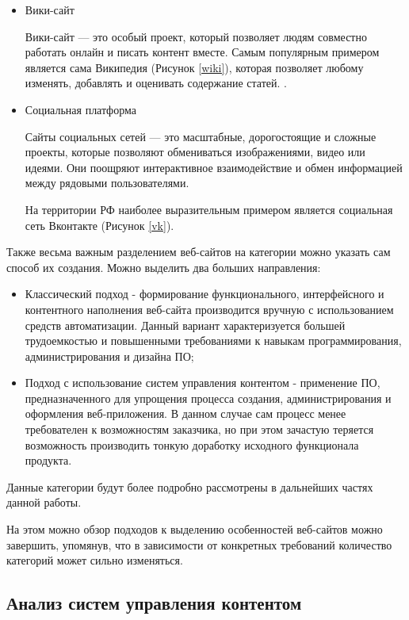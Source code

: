\begin{itemize}
    \item Вики-сайт
    
    Вики-сайт — это особый проект, который позволяет людям совместно работать онлайн и писать контент вместе. 
    Самым популярным примером является сама Википедия \cite{wiki} (Рисунок \ref{wiki}), которая позволяет любому изменять, добавлять и оценивать содержание статей.
    .
    
    \item Социальная платформа
    
    Сайты социальных сетей — это масштабные, дорогостоящие и сложные проекты, которые позволяют обмениваться изображениями, видео или идеями. 
    Они поощряют интерактивное взаимодействие и обмен информацией между рядовыми пользователями.
    
    На территории РФ наиболее выразительным примером является социальная сеть Вконтакте \cite{vk} (Рисунок \ref{vk}).
\end{itemize}

Также весьма важным разделением веб-сайтов на категории можно указать сам способ их создания.
Можно выделить два больших направления:
\begin{itemize}
    \item Классический подход - формирование функционального, интерфейсного и контентного наполнения веб-сайта производится вручную с использованием средств автоматизации.
    Данный вариант характеризуется большей трудоемкостью и повышенными требованиями к навыкам программирования, администрирования и дизайна ПО;
    \item Подход с использование систем управления контентом - применение ПО, предназначенного для упрощения процесса создания, администрирования и оформления веб-приложения.
    В данном случае сам процесс менее требователен к возможностям заказчика, но при этом зачастую теряется возможность производить тонкую доработку исходного функционала продукта.
\end{itemize}
Данные категории будут более подробно рассмотрены в дальнейших частях данной работы.

На этом можно обзор подходов к выделению особенностей веб-сайтов можно завершить, упомянув, что в зависимости от конкретных требований количество категорий может сильно изменяться.

\subsection{Анализ систем управления контентом}


